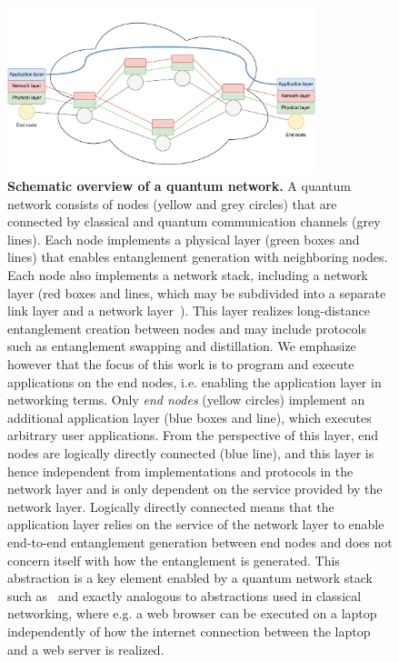 \begin{figure}[t]
    \centering
    \includegraphics[width=0.8\textwidth]{figures/background/network_nodes.pdf}
    \caption{
        \textbf{Schematic overview of a quantum network.}
        A quantum network consists of nodes (yellow and grey circles) that are connected by classical and quantum communication channels (grey lines).
        Each node implements a physical layer (green boxes and lines) that enables entanglement generation with neighboring nodes.
        Each node also implements a network stack, including a network layer (red boxes and lines, which may be subdivided into a separate link layer and a network layer~\cite{dahlberg_2019_egp, kozlowski_2019_towards}).
        This layer realizes long-distance entanglement creation between nodes and may include protocols such as entanglement swapping and distillation.
        \newline
        We emphasize however that the focus of this work is to program and execute applications on the end nodes, i.e. enabling the application layer in networking terms.
        Only \emph{end nodes} (yellow circles) implement an additional application layer (blue boxes and line), which executes arbitrary user applications.
        From the perspective of this layer, end nodes are logically directly connected (blue line), and this layer is hence independent from implementations and protocols in the network layer and is only dependent on the service  provided by the network layer.
        Logically directly connected means that the application layer relies on the service of the network layer to enable end-to-end entanglement generation between end nodes and does not concern itself with how the entanglement is generated.
        This abstraction is a key element enabled by a quantum network stack such as~\cite{dahlberg_2019_egp} and exactly analogous to abstractions used in classical networking, where e.g. a web browser can be executed on a laptop independently of how the internet connection between the laptop and a web server is realized.
    }
    \label{background:fig:network_model}
\end{figure}

